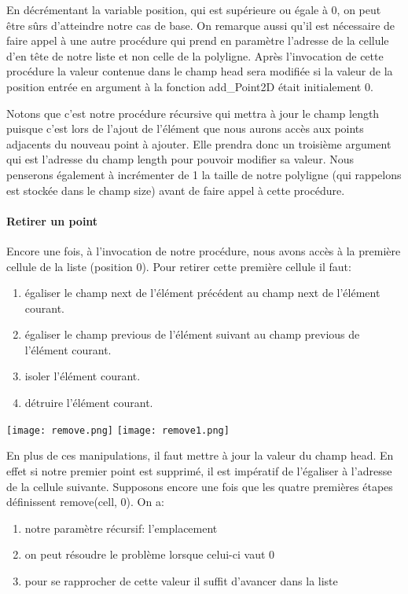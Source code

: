 \documentclass[a4paper, 11pt, oneside]{article}
\begin{document}
En décrémentant la variable position, qui est supérieure ou égale à 0, on peut être sûrs d'atteindre notre cas de base. On remarque aussi qu'il est nécessaire de faire appel à une autre procédure qui prend en paramètre l'adresse de la cellule d'en tête de notre liste et non celle de la polyligne. Après l'invocation de cette procédure la valeur contenue dans le champ head sera modifiée si la valeur de la position entrée en argument à la fonction add\_Point2D était initialement 0.

Notons que c'est notre procédure récursive qui mettra à jour le champ length puisque c'est lors de l'ajout de l'élément que nous aurons accès aux points adjacents du nouveau point à ajouter. Elle prendra donc un troisième argument qui est l'adresse du champ length pour pouvoir modifier sa valeur.  Nous penserons également à incrémenter de 1 la taille de notre polyligne (qui rappelons est stockée dans le champ size) avant de faire appel à cette procédure.


\paragraph{Retirer un point}

Encore une fois, à l'invocation de notre procédure, nous avons accès à la première cellule de la liste (position 0). Pour retirer cette première cellule il faut:
\begin{enumerate}
    \item égaliser le champ next de l'élément précédent au champ next de l'élément courant.
    \item égaliser le champ previous de l'élément suivant au champ previous de l'élément courant.
    \item isoler l'élément courant.
    \item détruire l'élément courant.
\end{enumerate}

\texttt{[image: remove.png]}
\texttt{[image: remove1.png]}

En plus de ces manipulations, il faut mettre à jour la valeur du champ head. En effet si notre premier point est supprimé, il est impératif de l'égaliser à l'adresse de la cellule suivante. Supposons encore une fois que les quatre premières étapes définissent remove(cell, 0). On a:

\begin{enumerate}
    \item notre paramètre récursif: l'emplacement
    \item on peut résoudre le problème lorsque celui-ci vaut 0
    \item pour se rapprocher de cette valeur il suffit d'avancer dans la liste
\end{enumerate}
\end{document}
